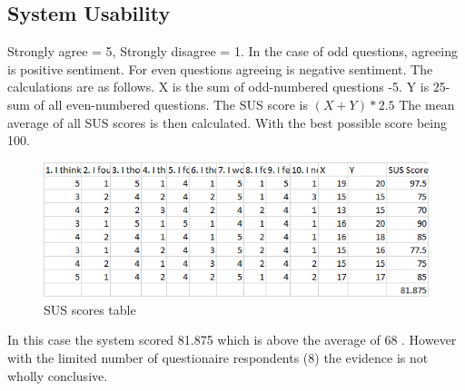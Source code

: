     \subsection{System Usability}
    Strongly agree = 5, Strongly disagree = 1. In the case of odd questions, agreeing is positive sentiment. For even questions agreeing is negative sentiment. The calculations are as follows. X is the sum of odd-numbered questions -5. Y is 25-sum of all even-numbered questions. The SUS score is $ (X+Y)*2.5 $ The mean average of all SUS scores is then calculated. With the best possible score being 100.
    \begin{figure}[H]
      \begin{center}
        \includegraphics[scale=0.7]{Images/susScoresTable}
        \caption{SUS scores table}
        \label{fig:sus_scores_table}
      \end{center}
    \end{figure}
    In this case the system scored 81.875 which is above the average of 68 \citep{Sauro2011}. However with the limited number of questionaire respondents (8) the evidence is not wholly conclusive.
